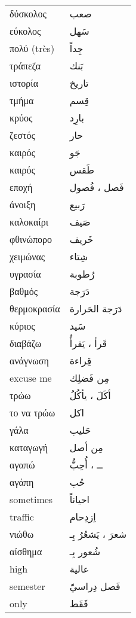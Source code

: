 \documentclass[twocolumn,a4paper]{article}
\newcommand{\ar}[1]{\textarabic{#1}}
\newcommand{\pl}{\raisebox{0.15ex}{\footnotesize ◍}}
\newcommand{\vrf}{\raisebox{0.15ex}{\footnotesize ◉}}
\newcommand{\vr}{\raisebox{0.15ex}{\footnotesize ◎}}
\newcommand{\mas}{\raisebox{0.15ex}{\footnotesize ◫}}
\begin{document}
\begin{mpsupertabular}{ P{0.5\textwidth} P{0.5\textwidth} }
δύσκολος       & \ar{ صعب } \\
εύκολος        & \ar{ سَهل } \\
πολύ (très)    & \ar{ جِداً } \\
τράπεζα        & \ar{ بَنك } \\
ιστορία        & \ar{ تاريخ } \\
τμήμα          & \ar{ قِسم } \\
κρύος          & \ar{ بارِد } \\
ζεστός         & \ar{ حار } \\
καιρός         & \ar{ جَو } \\
καιρός         & \ar{ طَقس } \\
εποχή \pl      & \ar{ فَصل ، فُصول } \\
άνοιξη         & \ar{ رَبيع } \\
καλοκαίρι      & \ar{ صَيف } \\
φθινώπορο      & \ar{ خَريف } \\
χειμώνας       & \ar{ شِتاء } \\
υγρασία        & \ar{ رُطوبة } \\
βαθμός         & \ar{ دَرَجة } \\
θερμοκρασία    & \ar{ دَرَجة الحَرارة } \\
κύριος         & \ar{ سَيد } \\
διαβάζω  \vrf   & \ar{ قَرأ ، يَقرأُ } \\
ανάγνωση \mas  & \ar{ قِراءة } \\
excuse me      & \ar{ مِن فَضلِك } \\
τρώω  \vrf      & \ar{ أكَلَ ، يأكُلُ } \\
το να τρώω \mas & \ar{ اكل } \\
γάλα           & \ar{ حَليب } \\
καταγωγή       & \ar{ مِن أصل } \\
αγαπώ \vr      & \ar{ ــ ، أُحِبُّ } \\  %
αγάπη \mas     & \ar{ حُب } \\
sometimes      & \ar{ احياناً } \\
traffic        & \ar{ اِزدِحام } \\
νιώθω \vrf     & \ar{ شعرَ ، يَشعُرُ بِـ } \\
αίσθημα \mas   & \ar{ شُعور بِـ } \\
high           & \ar{ عالية } \\
semester       & \ar{ فَصل دِراسيّ } \\
only           & \ar{ فَقَط } \\

\end{mpsupertabular}
\end{document}
